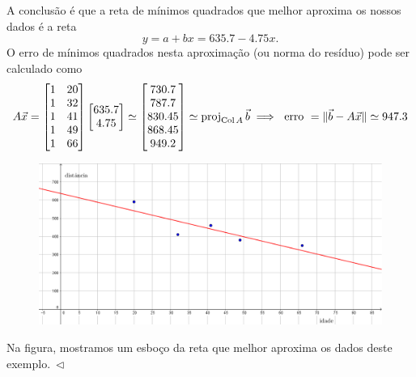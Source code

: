 \begin{ex}
  A conclusão é que a reta de mínimos quadrados que melhor aproxima os nossos dados é a reta
  \begin{equation}
  y = a + b x = 635.7 - 4.75 x.
  \end{equation} O erro de mínimos quadrados nesta aproximação (ou norma do resíduo) pode ser calculado como
  \begin{equation}
  A \vec{x} = \begin{bmatrix}
    1 & 20 \\
    1 & 32 \\
    1 & 41 \\
    1 & 49 \\
    1 & 66 \\
  \end{bmatrix}
  \begin{bmatrix}
    635.7 \\
    4.75 \\
  \end{bmatrix} \simeq
  \begin{bmatrix}
    730.7 \\
    787.7 \\
    830.45 \\
    868.45 \\
    949.2 \\
  \end{bmatrix} \simeq \operatorname{proj}_{\operatorname{Col} A} \vec{b} \implies \text{ erro } = \| \vec{b} - A\vec{x} \| \simeq 947.3
  \end{equation}
  \begin{figure}[h!]
    \begin{center}
      \includegraphics[width=1\linewidth]{Semana13/semana13-idade}
    \end{center}
  \end{figure}
 Na figura, mostramos um esboço da reta que melhor aproxima os dados deste exemplo$. \ \lhd$
\end{ex}



